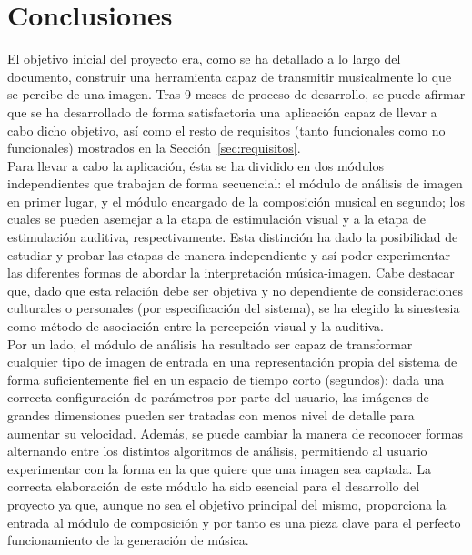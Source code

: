 \chapter{Conclusiones}
\label{chap:results}


El objetivo inicial del proyecto era, como se ha detallado a lo largo del documento, construir una herramienta capaz de transmitir musicalmente lo que se percibe de una imagen. Tras 9 meses de proceso de desarrollo, se puede afirmar que se ha desarrollado de forma satisfactoria una aplicación capaz de llevar a cabo dicho objetivo, así como el resto de requisitos (tanto funcionales como no funcionales) mostrados en la Sección~\ref{sec:requisitos}.\\



Para llevar a cabo la aplicación, ésta se ha dividido en dos módulos independientes que trabajan de forma secuencial: el módulo de análisis de imagen en primer lugar, y el módulo encargado de la composición musical en segundo; los cuales se pueden asemejar a la etapa de estimulación visual y a la etapa de estimulación auditiva, respectivamente. Esta distinción ha dado la posibilidad de estudiar y probar las etapas de manera independiente y así poder experimentar las diferentes formas de abordar la interpretación música-imagen. Cabe destacar que, dado que esta relación debe ser objetiva y no dependiente de consideraciones culturales o personales (por especificación del sistema), se ha elegido la sinestesia como método de asociación entre la percepción visual y la auditiva.\\


Por un lado, el módulo de análisis ha resultado ser capaz de transformar cualquier tipo de imagen de entrada en una representación propia del sistema de forma suficientemente fiel en un espacio de tiempo corto (segundos): dada una correcta configuración de parámetros por parte del usuario, las imágenes de grandes dimensiones pueden ser tratadas con menos nivel de detalle para aumentar su velocidad. Además, se puede cambiar la manera de reconocer formas alternando entre los distintos algoritmos de análisis, permitiendo al usuario experimentar con la forma en la que quiere que una imagen sea captada. La correcta elaboración de este módulo ha sido esencial para el desarrollo del proyecto ya que, aunque no sea el objetivo principal del mismo, proporciona la entrada al módulo de composición y por tanto es una pieza clave para el perfecto funcionamiento de la generación de música.\\

